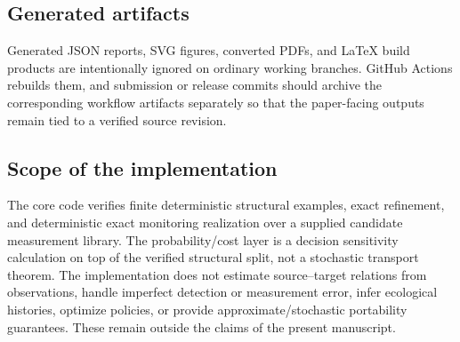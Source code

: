 \subsection{Generated artifacts}
Generated JSON reports, SVG figures, converted PDFs, and \LaTeX{} build products are intentionally ignored on ordinary working branches. GitHub Actions rebuilds them, and submission or release commits should archive the corresponding workflow artifacts separately so that the paper-facing outputs remain tied to a verified source revision.

\subsection{Scope of the implementation}
The core code verifies finite deterministic structural examples, exact refinement, and deterministic exact monitoring realization over a supplied candidate measurement library. The probability/cost layer is a decision sensitivity calculation on top of the verified structural split, not a stochastic transport theorem. The implementation does not estimate source--target relations from observations, handle imperfect detection or measurement error, infer ecological histories, optimize policies, or provide approximate/stochastic portability guarantees. These remain outside the claims of the present manuscript.
